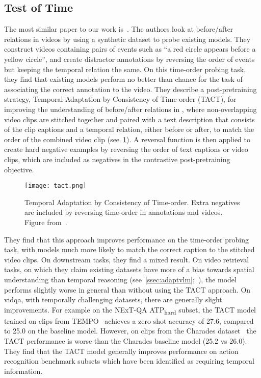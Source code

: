 \subsection{Test of Time}
\label{ssec:testoftime}
The most similar paper to our work is~\citet{bagad2023testoftime}. The authors
look at before/after relations in videos by using a synthetic dataset to
probe existing models. They construct videos containing pairs of events such
as ``a red circle appears before a yellow circle'', and create distractor
annotations by reversing the order of events but keeping the temporal relation
the same. On this time-order probing task, they find that existing models
perform no better than chance for the task of associating the correct
annotation to the video. They describe a post-pretraining strategy, Temporal
Adaptation by Consistency of Time-order (TACT), for improving the understanding
of before/after relations in , where non-overlapping video
clips are stitched together and paired with a text description that consists of
the clip captions and a temporal relation, either before or after, to match the
order of the combined video clip (see~\cref{fig:tact}). A reversal function is
then applied to create hard negative examples by reversing the order of text
captions or video clips, which are included as negatives in the contrastive
post-pretraining objective.

\begin{figure}[t]
	\centering
	\texttt{[image: tact.png]}
	\caption{Temporal Adaptation by Consistency of Time-order. Extra negatives
	are included by reversing time-order in annotations and videos. Figure
	from~\citet{bagad2023testoftime}.}
	\label{fig:tact}
\end{figure}

They find that this approach improves performance on the time-order probing
task, with models much more likely to match the correct caption to the stitched
video clips. On downstream tasks, they find a mixed result. On video retrieval
tasks, on which they claim existing datasets have more of a bias towards
spatial understanding than temporal reasoning
(see~\cref{ssec:adaptvlm};~\citet{buch2022revisiting,lei2023revealing,luo2022clip4clip}),
the model performs slightly worse in general than without using the TACT
approach. On \acrlong{vidqa}, with temporally challenging datasets, there are
generally slight improvements. For example on the NExT-QA
ATP\textsubscript{hard} subset, the TACT model trained on clips from
TEMPO~\citep{hendricks2018tempo} achieves a zero-shot accuracy of 27.6,
compared to 25.0 on the baseline model.  However, on clips from the Charades
dataset~\citep{sigurdsson2016charades} the TACT performance is worse than the
Charades baseline model (25.2 vs 26.0). They find that the TACT model generally
improves performance on action recognition benchmark subsets which have been
identified as requiring temporal information. 

